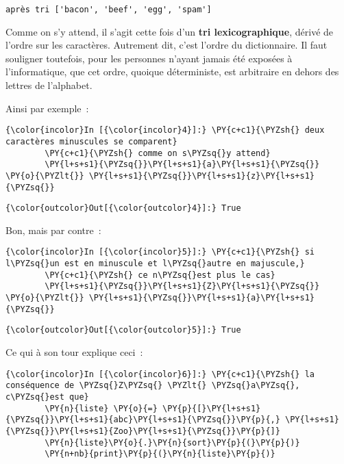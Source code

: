     \begin{Verbatim}[commandchars=\\\{\}]
après tri ['bacon', 'beef', 'egg', 'spam']

    \end{Verbatim}

    Comme on s'y attend, il s'agit cette fois d'un \textbf{tri
lexicographique}, dérivé de l'ordre sur les caractères. Autrement dit,
c'est l'ordre du dictionnaire. Il faut souligner toutefois, pour les
personnes n'ayant jamais été exposées à l'informatique, que cet ordre,
quoique déterministe, est arbitraire en dehors des lettres de
l'alphabet.

    Ainsi par exemple~:

    \begin{Verbatim}[commandchars=\\\{\}]
{\color{incolor}In [{\color{incolor}4}]:} \PY{c+c1}{\PYZsh{} deux caractères minuscules se comparent}
        \PY{c+c1}{\PYZsh{} comme on s\PYZsq{}y attend}
        \PY{l+s+s1}{\PYZsq{}}\PY{l+s+s1}{a}\PY{l+s+s1}{\PYZsq{}} \PY{o}{\PYZlt{}} \PY{l+s+s1}{\PYZsq{}}\PY{l+s+s1}{z}\PY{l+s+s1}{\PYZsq{}}
\end{Verbatim}


\begin{Verbatim}[commandchars=\\\{\}]
{\color{outcolor}Out[{\color{outcolor}4}]:} True
\end{Verbatim}
            
    Bon, mais par contre~:

    \begin{Verbatim}[commandchars=\\\{\}]
{\color{incolor}In [{\color{incolor}5}]:} \PY{c+c1}{\PYZsh{} si l\PYZsq{}un est en minuscule et l\PYZsq{}autre en majuscule,}
        \PY{c+c1}{\PYZsh{} ce n\PYZsq{}est plus le cas}
        \PY{l+s+s1}{\PYZsq{}}\PY{l+s+s1}{Z}\PY{l+s+s1}{\PYZsq{}} \PY{o}{\PYZlt{}} \PY{l+s+s1}{\PYZsq{}}\PY{l+s+s1}{a}\PY{l+s+s1}{\PYZsq{}}
\end{Verbatim}


\begin{Verbatim}[commandchars=\\\{\}]
{\color{outcolor}Out[{\color{outcolor}5}]:} True
\end{Verbatim}
            
    Ce qui à son tour explique ceci~:

    \begin{Verbatim}[commandchars=\\\{\}]
{\color{incolor}In [{\color{incolor}6}]:} \PY{c+c1}{\PYZsh{} la conséquence de \PYZsq{}Z\PYZsq{} \PYZlt{} \PYZsq{}a\PYZsq{}, c\PYZsq{}est que}
        \PY{n}{liste} \PY{o}{=} \PY{p}{[}\PY{l+s+s1}{\PYZsq{}}\PY{l+s+s1}{abc}\PY{l+s+s1}{\PYZsq{}}\PY{p}{,} \PY{l+s+s1}{\PYZsq{}}\PY{l+s+s1}{Zoo}\PY{l+s+s1}{\PYZsq{}}\PY{p}{]}
        \PY{n}{liste}\PY{o}{.}\PY{n}{sort}\PY{p}{(}\PY{p}{)}
        \PY{n+nb}{print}\PY{p}{(}\PY{n}{liste}\PY{p}{)}
\end{Verbatim}


